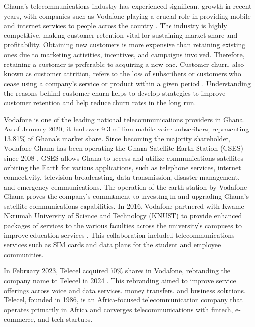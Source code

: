 \documentclass[doublespacing]{report} [12px]%
\begin{document}
Ghana's telecommunications industry has experienced significant growth in recent years, with companies such as Vodafone playing a crucial role in providing mobile and internet services to people across the country \cite{bandim2022}. The industry is highly competitive, making customer retention vital for sustaining market share and profitability. Obtaining new customers is more expensive than retaining existing ones due to marketing activities, incentives, and campaigns involved. Therefore, retaining a customer is preferable to acquiring a new one. Customer churn, also known as customer attrition, refers to the loss of subscribers or customers who cease using a company’s service or product within a given period \cite{Koranchirath2024}. Understanding the reasons behind customer churn helps to develop strategies to improve customer retention and help reduce churn rates in the long run.

Vodafone is one of the leading national telecommunications providers in Ghana. As of January 2020, it had over 9.3 million mobile voice subscribers, representing 13.81\% of Ghana's market share. Since becoming the majority shareholder, Vodafone Ghana has been operating the Ghana Satellite Earth Station (GSES) since 2008 \cite{vodafone_ghana}. GSES allows Ghana to access and utilize communications satellites orbiting the Earth for various applications, such as telephone services, internet connectivity, television broadcasting, data transmission, disaster management, and emergency communications. The operation of the earth station by Vodafone Ghana proves the company's commitment to investing in and upgrading Ghana's satellite communications capabilities.
In 2016, Vodafone partnered with Kwame Nkrumah University of Science and Technology (KNUST) to provide enhanced packages of services to the various faculties across the university's campuses to improve education services \cite{vodafone_knust}. This collaboration included telecommunications services such as SIM cards and data plans for the student and employee communities.

In February 2023, Telecel acquired 70\% shares in Vodafone, rebranding the company name to Telecel in 2024 \cite{telecel_ghana}. This rebranding aimed to improve service offerings across voice and data services, money transfers, and business solutions. Telecel, founded in 1986, is an Africa-focused telecommunication company that operates primarily in Africa and converges telecommunications with fintech, e-commerce, and tech startups.
\end{document}
